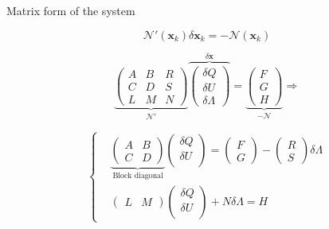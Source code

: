 \documentclass[24pt,t,table, aspectratio=169]{beamer}
\newcommand{\vecx}{\mathbf{x}}
\begin{document}
\begin{frame}{Matrix form of the system}

\begin{framed}
\begin{equation*}
\mathcal{N}'(\vecx_k) \delta \vecx_k = - \mathcal{N}(\vecx_k) 
\end{equation*}
\end{framed}

{
\begin{minipage}{.49\linewidth}
\begin{equation*}
    \underbrace{
    \begin{pmatrix}
        A & B & R\\
        C & D & S\\
        L & M & N
    \end{pmatrix}
    }_{\mathcal{N}'}
    \overbrace{
    \begin{pmatrix}
        \delta Q\\
        \delta U\\
        \delta \Lambda
    \end{pmatrix}
    }^{\delta \vecx}
    = 
    \underbrace{
    \begin{pmatrix}
        F\\
        G\\
        H
    \end{pmatrix}
    }_{-\mathcal{N}} \Rightarrow
\end{equation*}
\end{minipage}
\begin{minipage}{.49\linewidth}
\begin{equation*}
\left\{
\begin{aligned}
	& \underbrace{
    \begin{pmatrix}
        A & B\\
        C & D
    \end{pmatrix}
    }_{\text{Block diagonal}}
    \begin{pmatrix}
        \delta Q\\
        \delta U\\
    \end{pmatrix}
    =
    \begin{pmatrix}
        F\\
        G
    \end{pmatrix}
    -
    \begin{pmatrix}
        R\\
        S
    \end{pmatrix}
    \delta \Lambda\\
    & \begin{pmatrix}
        L & M
    \end{pmatrix}
    \begin{pmatrix}
        \delta Q\\
        \delta U\\
    \end{pmatrix}
    + N \delta \Lambda
    = H
    \end{aligned}
    \right.
\end{equation*}
\end{minipage}
}


\end{frame}
\end{document}
